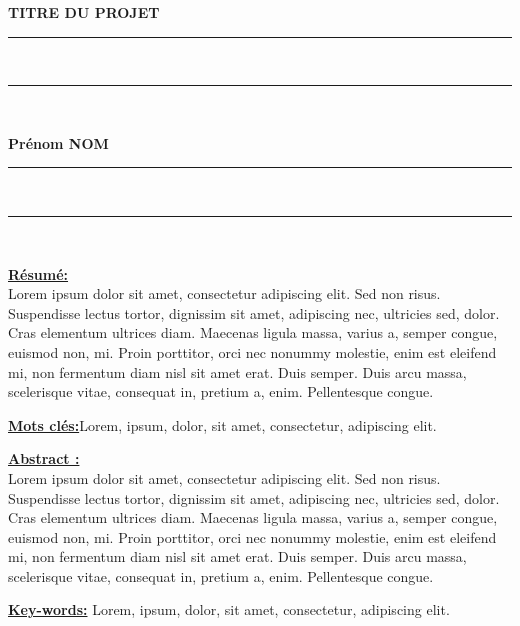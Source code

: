 \newpage
\thispagestyle{empty}
\begin{center}
  \renewcommand*{\familydefault}{\defaultFont}
  \fontsize{12pt}{12pt}\selectfont%
  \textbf{
  TITRE DU PROJET\\%
  }
\vspace{15pt} {%
  \begin{spacing}{0.05}
    \rule{200pt}{2pt}\\
    \rule{200pt}{0.75pt}\\
  \end{spacing}
  \renewcommand*{\familydefault}{\defaultFont}
  \fontsize{14pt}{14pt}\selectfont%
  \vspace{15pt}
  \textbf{Prénom NOM}
  \vspace{8pt}
  \begin{spacing}{0.05}
    \rule{200pt}{0.75pt}\\
    \rule{200pt}{2pt}\\
  \end{spacing}
}
\end{center}

\fontsize{12pt}{12pt}\selectfont%
\underline{\textbf{Résumé:}}\\
Lorem ipsum dolor sit amet, consectetur adipiscing elit. Sed non risus. Suspendisse lectus tortor, dignissim sit amet, adipiscing nec, ultricies sed, dolor. Cras elementum ultrices diam. Maecenas ligula massa, varius a, semper congue, euismod non, mi. Proin porttitor, orci nec nonummy molestie, enim est eleifend mi, non fermentum diam nisl sit amet erat. Duis semper. Duis arcu massa, scelerisque vitae, consequat in, pretium a, enim. Pellentesque congue.\par
\begin{spacing}{1}
\underline{\textbf{Mots clés:}}Lorem, ipsum, dolor, sit amet, consectetur, adipiscing elit.\\
\end{spacing}
\underline{\textbf{Abstract :}}\\
Lorem ipsum dolor sit amet, consectetur adipiscing elit. Sed non risus. Suspendisse lectus tortor, dignissim sit amet, adipiscing nec, ultricies sed, dolor. Cras elementum ultrices diam. Maecenas ligula massa, varius a, semper congue, euismod non, mi. Proin porttitor, orci nec nonummy molestie, enim est eleifend mi, non fermentum diam nisl sit amet erat. Duis semper. Duis arcu massa, scelerisque vitae, consequat in, pretium a, enim. Pellentesque congue.\par
\begin{spacing}{1}
\underline{\textbf{Key-words:}} Lorem, ipsum, dolor, sit amet, consectetur, adipiscing elit.\\
\end{spacing}
 


    
